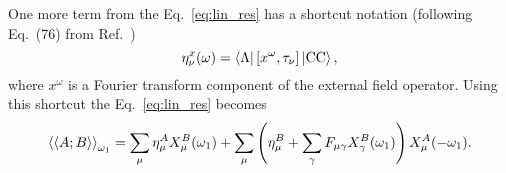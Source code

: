 \documentclass{article}
\begin{document}
One more term from the Eq.~\eqref{eq:lin_res} has a shortcut notation
(following Eq.~(76) from Ref.~\cite{kochCoupledClusterResponse1990})
\begin{equation}
    \eta ^x _\nu (\omega) = 
    \bra{\Lambda}
    \commutator{x ^\omega}{\tau _\nu}
    \ket{\text{CC}},
    \label{eq:eta}
\end{equation}
where $x ^\omega$ is a Fourier transform component of the external field
operator. Using this shortcut the Eq.~\eqref{eq:lin_res} becomes
\begin{equation}
    \expval{\expval{A; B}} _{\omega _1}
    =
    \sum _\mu
        \eta ^A _\mu
        X ^B _\mu (\omega _1)
    +
    \sum _\mu
    \left(
        \eta ^B _\mu
        +
        \sum _\gamma
            F _{\mu \gamma}
            X ^B _\gamma (\omega _1)
    \right)
    X ^A _\mu (-\omega _1).
    \label{eq:lin_res2}
\end{equation}

\printbibliography{}
\end{document}
